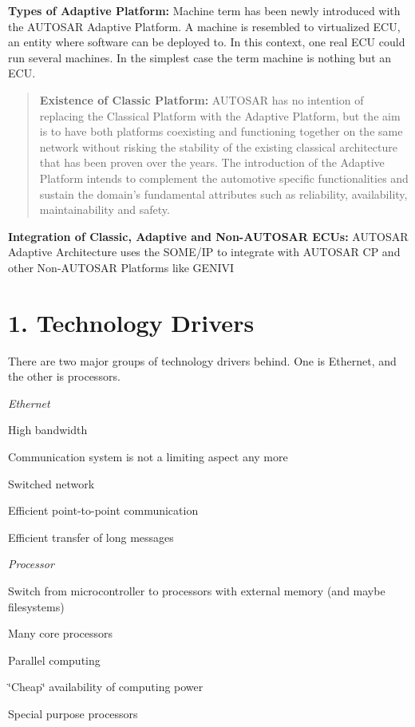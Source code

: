 {\bfseries Types of Adaptive Platform\+:} Machine term has been newly introduced with the A\+U\+T\+O\+S\+AR Adaptive Platform. A machine is resembled to virtualized E\+CU, an entity where software can be deployed to. In this context, one real E\+CU could run several machines. In the simplest case the term machine is nothing but an E\+CU. 

\begin{quote}
{\bfseries Existence of Classic Platform\+:} A\+U\+T\+O\+S\+AR has no intention of replacing the Classical Platform with the Adaptive Platform, but the aim is to have both platforms coexisting and functioning together on the same network without risking the stability of the existing classical architecture that has been proven over the years. The introduction of the Adaptive Platform intends to complement the automotive specific functionalities and sustain the domain’s fundamental attributes such as reliability, availability, maintainability and safety. \end{quote}


{\bfseries Integration of Classic, Adaptive and Non-\/\+A\+U\+T\+O\+S\+AR E\+C\+Us\+:} A\+U\+T\+O\+S\+AR Adaptive Architecture uses the S\+O\+M\+E/\+IP to integrate with A\+U\+T\+O\+S\+AR CP and other Non-\/\+A\+U\+T\+O\+S\+AR Platforms like G\+E\+N\+I\+VI  \section*{1. Technology Drivers}

There are two major groups of technology drivers behind. One is Ethernet, and the other is processors.
\begin{DoxyItemize}
\item {\itshape Ethernet}
\begin{DoxyItemize}
\item High bandwidth
\item Communication system is not a limiting aspect any more
\item Switched network
\item Efficient point-\/to-\/point communication
\item Efficient transfer of long messages
\end{DoxyItemize}
\item {\itshape Processor}
\begin{DoxyItemize}
\item Switch from microcontroller to processors with external memory (and maybe filesystems)
\item Many core processors
\item Parallel computing
\item \char`\"{}\+Cheap\char`\"{} availability of computing power
\item Special purpose processors
\end{DoxyItemize}
\end{DoxyItemize}

